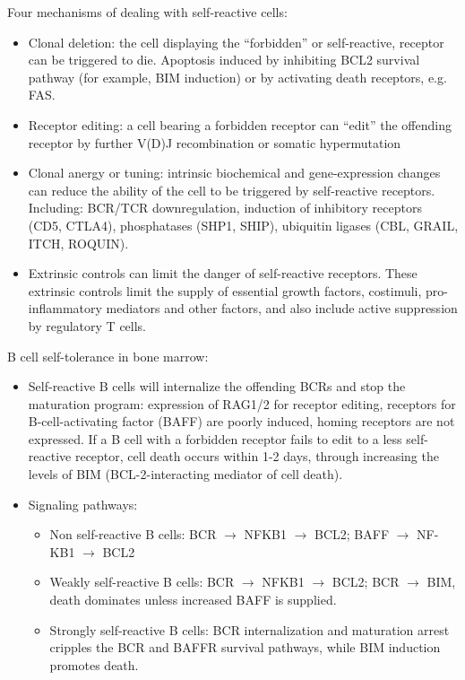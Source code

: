 \documentclass{report}
\begin{document}
Four mechanisms of dealing with self-reactive cells: 
\begin{itemize}
\item Clonal deletion: the cell displaying the ``forbidden'' or self-reactive, receptor can be triggered to die. Apoptosis induced by inhibiting BCL2 survival pathway (for example, BIM induction) or by activating death receptors, e.g. FAS. 

\item Receptor editing: a cell bearing a forbidden receptor can ``edit'' the offending receptor by further V(D)J recombination or somatic hypermutation

\item Clonal anergy or tuning: intrinsic biochemical and gene-expression changes can reduce the ability of the cell to be triggered by self-reactive receptors. Including: BCR/TCR downregulation, induction of inhibitory receptors (CD5, CTLA4), phosphatases (SHP1, SHIP), ubiquitin ligases (CBL, GRAIL, ITCH, ROQUIN). 

\item Extrinsic controls can limit the danger of self-reactive receptors. These extrinsic controls limit the supply of essential growth factors, costimuli, pro-inflammatory mediators and other factors, and also include active suppression by regulatory T cells. 
\end{itemize}

B cell self-tolerance in bone marrow: 
\begin{itemize}
\item Self-reactive B cells will internalize the offending BCRs and stop the maturation program: expression of RAG1/2 for receptor editing, receptors for B-cell-activating factor (BAFF) are poorly induced, homing receptors are not expressed. If a B cell with a forbidden receptor fails to edit to a less self-reactive receptor, cell death occurs within 1-2 days, through increasing the levels of BIM (BCL-2-interacting mediator of cell death). 
	
\item Signaling pathways: 
\begin{itemize}
	\item Non self-reactive B cells: BCR $\rightarrow$ NFKB1 $\rightarrow$ BCL2; BAFF $\rightarrow$ NF-KB1 $\rightarrow$ BCL2
	\item Weakly self-reactive B cells: BCR $\rightarrow$ NFKB1 $\rightarrow$ BCL2; BCR $\rightarrow$ BIM, death dominates unless increased BAFF is supplied. 
	\item Strongly self-reactive B cells: BCR internalization and maturation arrest cripples the BCR and BAFFR survival pathways, while BIM induction promotes death. 
\end{itemize}

\end{itemize}
\end{document}
